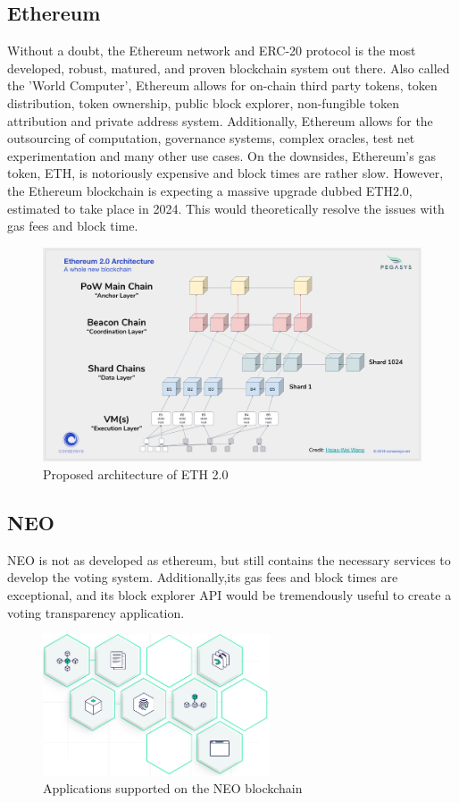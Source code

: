\documentclass{article}
\begin{document}
\subsection{Ethereum}
Without a doubt, the Ethereum network and ERC-20 protocol is the most developed, robust, matured, and proven blockchain system out there. Also called the 'World Computer', Ethereum allows for on-chain third party tokens, token distribution, token ownership, public block explorer, non-fungible token attribution and private address system. Additionally, Ethereum allows for the outsourcing of computation, governance systems, complex oracles, test net experimentation and many other use cases. On the downsides, Ethereum's gas token, ETH, is notoriously expensive and block times are rather slow.\cite{di2020tokens}
\smallbreak\noindent
However, the Ethereum blockchain is expecting a massive upgrade dubbed ETH2.0, estimated to take place in 2024. This would theoretically resolve the issues with gas fees and block time.
\begin{figure}[ht!]
    \centering
    \includegraphics[width=\textwidth]{eth2.png}
    \caption{Proposed architecture of ETH 2.0}
\end{figure}

\subsection{NEO}
\smallbreak
NEO is not as developed as ethereum, but still contains the necessary services to develop the voting system. Additionally,its gas fees and block times are exceptional, and its block explorer API would be tremendously useful to create a voting transparency application.\cite{elrom2019neo}
\begin{figure}[ht!]
    \centering
    \includegraphics[width=0.6\textwidth]{neo_tech.PNG}
    \caption{Applications supported on the NEO blockchain}
\end{figure}
\end{document}
